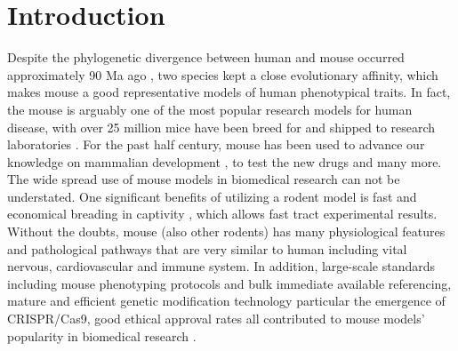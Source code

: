 \section{Introduction}

Despite the phylogenetic divergence between human and mouse occurred approximately 90 Ma ago \cite{Hedges_2006}, two species kept a close evolutionary affinity, which makes mouse a good representative models of human phenotypical traits. In fact, the mouse is arguably one of the most popular research models for human disease, with over 25 million mice have been breed for and shipped to research laboratories \cite{Rosenthal_2007}. For the past half century, mouse has been used to advance our knowledge on mammalian development \cite{Ueda_2006, Cheon_2011}, to test the new drugs \cite{Van_Dam_2011} and many more. The wide spread use of mouse models in biomedical research can not be understated. \cite{MORSEIII_2007} One significant benefits of utilizing a rodent model is fast and economical breading in captivity \cite{Rosenthal_2007}, which allows fast tract experimental results. \cite{Vandamme_2014} Without the doubts, mouse (also other rodents) has many physiological features and pathological pathways that are very similar to human including vital nervous, cardiovascular and immune system. \cite{MORSEIII_2007,Rosenthal_2007} In addition, large-scale standards including mouse phenotyping protocols and bulk immediate available referencing, mature and efficient genetic modification technology particular the emergence of CRISPR/Cas9, good ethical approval rates all contributed to mouse models' popularity in biomedical research \cite{26214591, Rosenthal_2007}. 
\\

